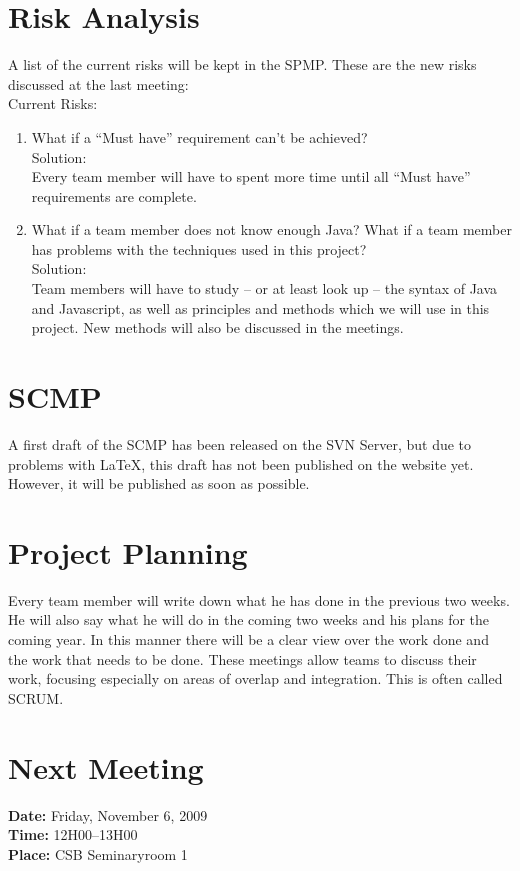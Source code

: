 \documentclass[a4paper, 12pt]{article}
\begin{document}
	\section{Risk Analysis}
A list of the current risks will be kept in the SPMP\cite{site2}. These are the new risks discussed at the last meeting:\\
	Current Risks:
		\begin{enumerate}
		\item  What if a ``Must have'' requirement can't be achieved?\\
		Solution:\\
Every team member will have to spent more time until all ``Must have'' requirements are complete. 
		\item  What if a team member does not know enough Java? What if a team member has problems with the techniques used in this project?\\
		Solution:\\
Team members will have to study -- or at least look up -- the syntax of Java and Javascript, as well as principles and methods which we will use in this project. New methods will also be discussed in the meetings.
		\end{enumerate}
	\section{SCMP}
A first draft of the SCMP has been released on the SVN Server, but due to problems with \LaTeX{}, this draft has not been published on the website yet. However, it will be published as soon as possible.

	\section{Project Planning}
Every team member will write down what he has done in the previous two weeks. He will also say what he will do in the coming two weeks and his plans for the coming year. In this manner there will be a clear view over the work done and the work that needs to be done. These meetings allow teams to discuss their work, focusing especially on areas of overlap and integration. This is often called SCRUM.
		
	\section{Next Meeting}

		\textbf{Date:} Friday, November 6, 2009\\
		\textbf{Time:} 12H00--13H00\\
		\textbf{Place:} CSB Seminaryroom 1\\
	
\end{document}
